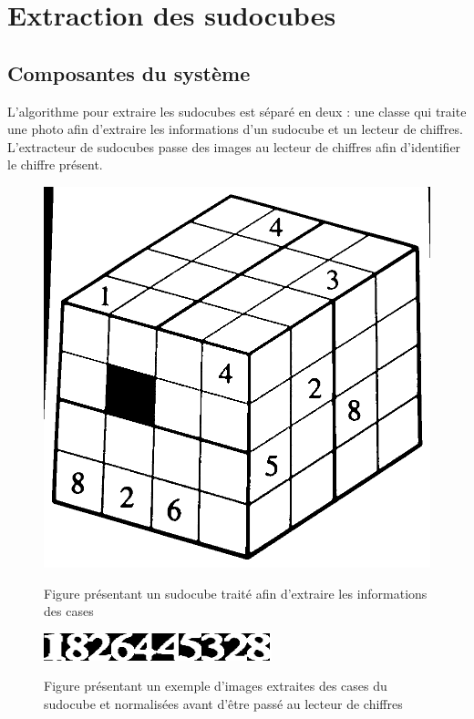 \section{Extraction des sudocubes}
\subsection{Composantes du système}
L'algorithme pour extraire les sudocubes est séparé en deux : une classe qui traite une photo afin d'extraire les informations d'un sudocube et un lecteur de chiffres. L'extracteur de sudocubes passe des images au lecteur de chiffres afin d'identifier le chiffre présent.

\begin{figure}[htbp]
\centering
\includegraphics[scale=0.25]{fig/sudocubeThreshold.png}
\label{fig:sudoThresh}
\caption{Figure présentant un sudocube traité afin d'extraire les informations des cases}
\end{figure}

\begin{figure}[htbp]
\centering
\includegraphics[scale=0.9]{fig/chiffresLues.png}
\label{fig:chifLu}
\caption{Figure présentant un exemple d'images extraites des cases du sudocube et normalisées avant d'être passé au lecteur de chiffres}
\end{figure}

